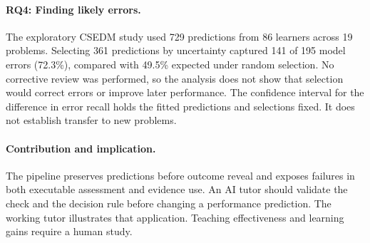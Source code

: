 \paragraph{RQ4: Finding likely errors.}
The exploratory CSEDM study used 729 predictions from 86 learners across 19 problems. Selecting 361 predictions by uncertainty
captured 141 of 195 model errors (72.3\%), compared with 49.5\% expected under random selection. No corrective review was performed, so the
analysis does not show that selection would correct errors or improve later performance. The confidence interval for the difference in error recall holds the fitted
predictions and selections fixed. It does not establish transfer to new problems.

\paragraph{Contribution and implication.}
The pipeline preserves predictions before outcome reveal and exposes failures in both executable assessment and evidence use.
An AI tutor should validate the check and the decision rule before changing a performance prediction. The working tutor
illustrates that application. Teaching effectiveness and learning gains require a human study.
